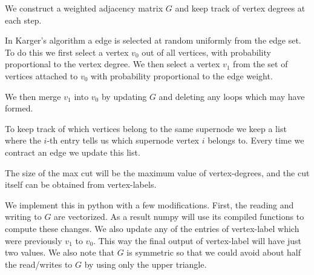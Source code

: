 \documentclass[10pt]{article}
\begin{document}
\begin{solution}[Solution]

We construct a weighted adjacency matrix \( G \) and keep track of vertex degrees at each step.

In Karger's algorithm a edge is selected at random uniformly from the edge set.
To do this we first select a vertex \( v_0 \) out of all vertices, with probability proportional to the vertex degree. We then select a vertex \( v_1 \) from the set of vertices attached to \( v_0 \) with probability proportional to the edge weight.

We then merge \( v_1 \) into \( v_0 \) by updating \( G \) and deleting any loops which may have formed.

To keep track of which vertices belong to the same supernode we keep a list where the \( i \)-th entry tells us which supernode vertex \( i \) belongs to. Every time we contract an edge we update this list.

\iffalse    
In pseudo-code, our algorithm is as follows.
\begin{algorithm}[h]
\begin{algorithmic}[1]
\Function{Karger}{G,V,vertex-degrees,vertex-labels}
    \While{count-if-nonzero(vertex-degrees) \( >2 \)}
        \State select random vertex \( v_0 \) from \( V \)  weighted proportional to vertex-degrees 
        \State select random vertex \( v_1 \) from \( V \)  weighted proportional to  \( G_{v_1,:} \) 
        \State vertex-labels[\(v_1\)]\( \: = v_0 \)
        \For{\(v\) in \( V\setminus \{v_0,v_1\} \)}
            \State \( G_{v_0,v} \mathrel{+}= G_{v_1,v} \) 
            ,\hspace{1em} \( G_{v,v_0} \mathrel{+}= G_{v,v_1} \)
            \State vertex-degrees[\(v_0\)]\( \: \mathrel{+}= 1 \)
            \State \( G_{v_1,v} = 0 \) 
            ,\hspace{1em} \( G_{v,v_1} = 0 \)
        \EndFor
        \State \( G_{v_0,v_1} = 0 \)
        ,\hspace{1em} \( G_{v_1,v_0} = 0 \)
    \EndWhile
    \State \Return vertex-labels,vertex-degrees
\EndFunction
\end{algorithmic}
\end{algorithm}
\fi

The size of the max cut will be the maximum value of vertex-degrees, and the cut itself can be obtained from vertex-labels.

We implement this in python with a few modifications. 
    First, the reading and writing to \( G \) are vectorized. As a result numpy will use its compiled functions to compute these changes. We also update any of the entries of vertex-label which were previously \( v_1 \) to \( v_0 \). This way the final output of vertex-label will have just two values. 
    We also note that \( G \) is symmetric so that we could avoid about half the read/writes to \( G \) by using only the upper triangle.



\end{solution}
\end{document}
